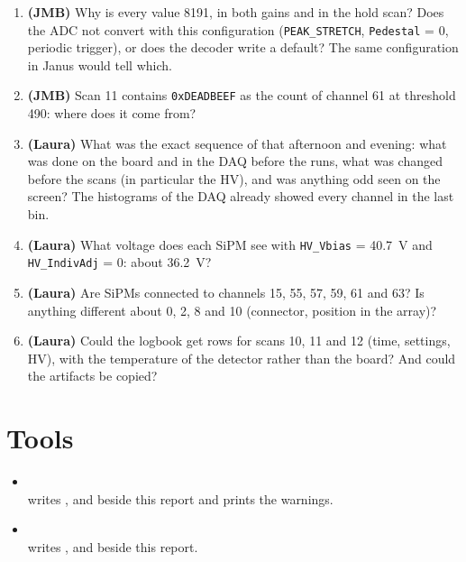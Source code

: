 \documentclass[11pt,a4paper]{article}
\begin{document}
\begin{enumerate}
\item \textbf{(JMB)} Why is every value 8191, in both gains and in the hold scan? Does the ADC
  not convert with this configuration (\texttt{PEAK\_STRETCH}, \texttt{Pedestal} = 0, periodic
  trigger), or does the decoder write a default? The same configuration in Janus would tell
  which.
\item \textbf{(JMB)} Scan 11 contains \texttt{0xDEADBEEF} as the count of channel 61 at
  threshold 490: where does it come from?
\item \textbf{(Laura)} What was the exact sequence of that afternoon and evening: what was done
  on the board and in the DAQ before the runs, what was changed before the scans (in
  particular the HV), and was anything odd seen on the screen? The histograms of the DAQ already
  showed every channel in the last bin.
\item \textbf{(Laura)} What voltage does each SiPM see with \texttt{HV\_Vbias} = 40.7~V and
  \texttt{HV\_IndivAdj} = 0: about 36.2~V?
\item \textbf{(Laura)} Are SiPMs connected to channels 15, 55, 57, 59, 61 and 63? Is anything
  different about 0, 2, 8 and 10 (connector, position in the array)?
\item \textbf{(Laura)} Could the logbook get rows for scans 10, 11 and 12 (time, settings, HV),
  with the temperature of the detector rather than the board? And could the
   artifacts be copied?
\end{enumerate}

\section{Tools}

\begin{itemize}
\item \sloppy{}\\
   writes ,  and  beside this report and
  prints the warnings.
\item {}\\ writes
  ,  and  beside
  this report.
\end{itemize}
\end{document}
